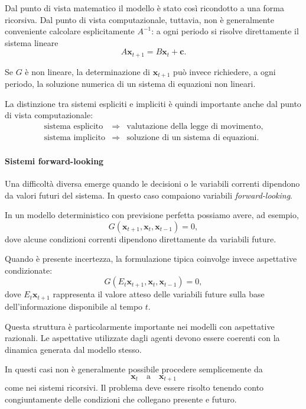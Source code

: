 \documentclass{book}
\begin{document}
Dal punto di vista matematico il modello è stato così ricondotto a una
forma ricorsiva. Dal punto di vista computazionale, tuttavia, non è
generalmente conveniente calcolare esplicitamente $A^{-1}$: a ogni
periodo si risolve direttamente il sistema lineare
\[
A\mathbf{x}_{t+1}
=
B\mathbf{x}_t+\mathbf{c}.
\]

Se $G$ è non lineare, la determinazione di $\mathbf{x}_{t+1}$ può
invece richiedere, a ogni periodo, la soluzione numerica di un sistema
di equazioni non lineari.

La distinzione tra sistemi espliciti e impliciti è quindi importante
anche dal punto di vista computazionale:
\[
\begin{array}{ccc}
\text{sistema esplicito}
&
\Rightarrow
&
\text{valutazione della legge di movimento},
\\[2mm]
\text{sistema implicito}
&
\Rightarrow
&
\text{soluzione di un sistema di equazioni}.
\end{array}
\]

\paragraph{Sistemi forward-looking}

Una difficoltà diversa emerge quando le decisioni o le variabili
correnti dipendono da valori futuri del sistema. In questo caso
compaiono variabili \emph{forward-looking}.

In un modello deterministico con previsione perfetta possiamo avere,
ad esempio,
\[
G(\mathbf{x}_{t+1},\mathbf{x}_t,\mathbf{x}_{t-1})=0,
\]
dove alcune condizioni correnti dipendono direttamente da variabili
future.

Quando è presente incertezza, la formulazione tipica coinvolge invece
aspettative condizionate:
\[
G(E_t\mathbf{x}_{t+1},\mathbf{x}_t,\mathbf{x}_{t-1})=0,
\]
dove $E_t\mathbf{x}_{t+1}$ rappresenta il valore atteso delle variabili
future sulla base dell'informazione disponibile al tempo $t$.

Questa struttura è particolarmente importante nei modelli con
aspettative razionali. Le aspettative utilizzate dagli agenti devono
essere coerenti con la dinamica generata dal modello stesso.

In questi casi non è generalmente possibile procedere semplicemente
da
\[
\mathbf{x}_t
\quad\text{a}\quad
\mathbf{x}_{t+1}
\]
come nei sistemi ricorsivi. Il problema deve essere risolto tenendo
conto congiuntamente delle condizioni che collegano presente e futuro.
\end{document}
